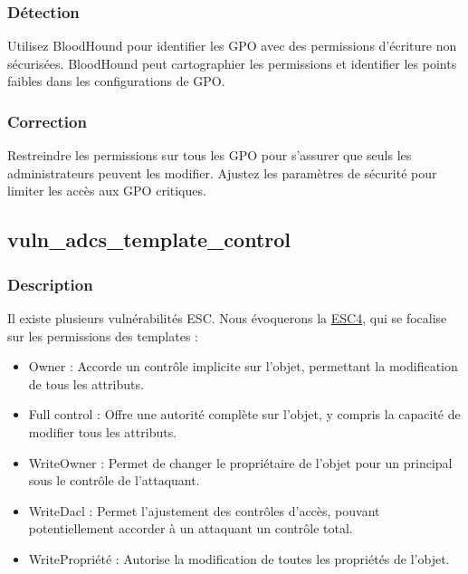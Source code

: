 \documentclass{article}
\begin{document}
\subsubsection{Détection}
Utilisez BloodHound pour identifier les GPO avec des permissions d'écriture non sécurisées. BloodHound peut cartographier les permissions et identifier les points faibles dans les configurations de GPO.

\subsubsection{Correction}
Restreindre les permissions sur tous les GPO pour s'assurer que seuls les administrateurs peuvent les modifier. Ajustez les paramètres de sécurité pour limiter les accès aux GPO critiques.

\subsection{vuln\_adcs\_template\_control}

\subsubsection{Description}
Il existe plusieurs vulnérabilités ESC. Nous évoquerons la \href{https://book.hacktricks.xyz/windows-hardening/active-directory-methodology/ad-certificates/domain-escalation}{ESC4}, qui se focalise sur les permissions des templates :
\begin{itemize}
    \item Owner : Accorde un contrôle implicite sur l'objet, permettant la modification de tous les attributs.
    \item Full control : Offre une autorité complète sur l'objet, y compris la capacité de modifier tous les attributs.
    \item WriteOwner : Permet de changer le propriétaire de l'objet pour un principal sous le contrôle de l'attaquant.
    \item WriteDacl : Permet l'ajustement des contrôles d'accès, pouvant potentiellement accorder à un attaquant un contrôle total.
    \item WritePropriété : Autorise la modification de toutes les propriétés de l'objet.
\end{itemize}
\end{document}
